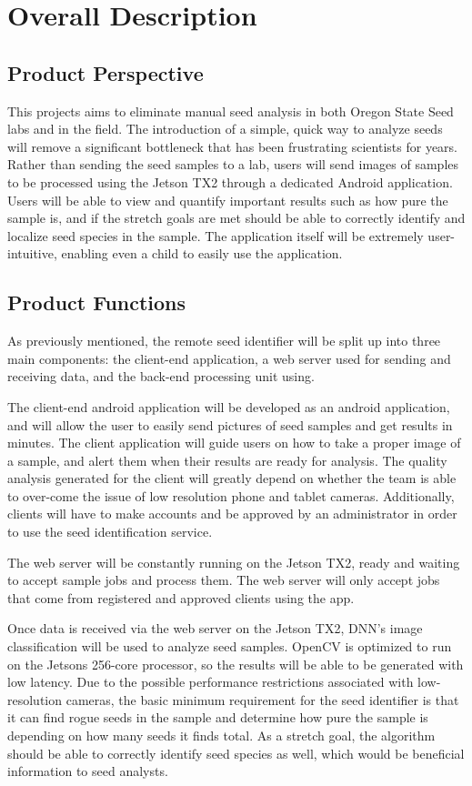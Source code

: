 \documentclass[onecolumn, draftclsnofoot,10pt, compsoc]{IEEEtran}
\begin{document}
\section{Overall Description}
\subsection{Product Perspective}
This projects aims to eliminate manual seed analysis in both Oregon State Seed labs and in the field. The introduction of a simple, quick way to analyze seeds will remove a significant bottleneck that has been frustrating scientists for years.
Rather than sending the seed samples to a lab, users will send images of samples to be processed using the Jetson TX2 through a dedicated Android application.
Users will be able to view and quantify important results such as how pure the sample is, and if the stretch goals are met should be able to correctly identify and localize seed species in the sample.
The application itself will be extremely user-intuitive, enabling even a child to easily use the application.  


\subsection{Product Functions}

As previously mentioned, the remote seed identifier will be split up into three main components: the client-end application, a web server used for sending and receiving data, and the back-end processing unit using. 

The client-end android application will be developed as an android application, and will allow the user to easily send pictures of seed samples and get results in minutes. The client application will guide users on how to take a proper image of a sample, and alert them when their results are ready for analysis. The quality analysis generated for the client will greatly depend on whether the team is able to over-come the issue of low resolution phone and tablet cameras. Additionally, clients will have to make accounts and be approved by an administrator in order to use the seed identification service.

The web server will be constantly running on the Jetson TX2, ready and waiting to accept sample jobs and process them. The web server will only accept jobs that come from registered and approved clients using the app. 

Once data is received via the web server on the Jetson TX2, DNN's image classification will be used to analyze seed samples. OpenCV is optimized to run on the Jetsons 256-core processor, so the results will be able to be generated with low latency. Due to the possible performance restrictions associated with low-resolution cameras, the basic minimum requirement for the seed identifier is that it can find rogue seeds in the sample and determine how pure the sample is depending on how many seeds it finds total. As a stretch goal, the algorithm should be able to correctly identify seed species as well, which would be beneficial information to seed analysts.
\end{document}
